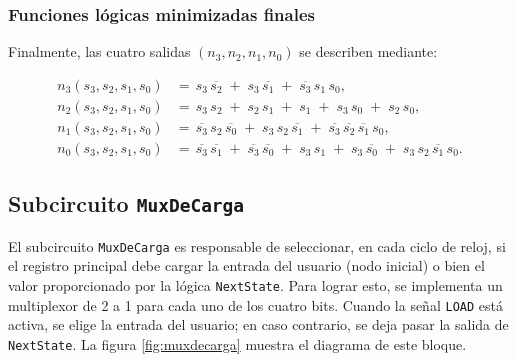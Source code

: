 \documentclass[12pt]{article}
\begin{document}
\subsubsection{Funciones lógicas minimizadas finales}

Finalmente, las cuatro salidas \((n_{3},n_{2},n_{1},n_{0})\) se describen mediante:

\[
\begin{aligned}
  n_{3}(s_{3},s_{2},s_{1},s_{0})
  &=\, s_{3}\,\overline{s_{2}}
    \;+\; s_{3}\,\overline{s_{1}}
    \;+\; \overline{s_{3}}\,s_{1}\,s_{0},\\[6pt]
  n_{2}(s_{3},s_{2},s_{1},s_{0})
  &=\, s_{3}\,s_{2}
    \;+\; s_{2}\,s_{1}
    \;+\; s_{1}
    \;+\; s_{3}\,s_{0}
    \;+\; s_{2}\,s_{0},\\[6pt]
  n_{1}(s_{3},s_{2},s_{1},s_{0})
  &=\, \overline{s_{3}}\,s_{2}\,\overline{s_{0}}
    \;+\; s_{3}\,s_{2}\,\overline{s_{1}}
    \;+\; \overline{s_{3}}\,\overline{s_{2}}\,\overline{s_{1}}\,s_{0},\\[6pt]
  n_{0}(s_{3},s_{2},s_{1},s_{0})
  &=\, \overline{s_{3}}\,\overline{s_{1}}
    \;+\; \overline{s_{3}}\,\overline{s_{0}}
    \;+\; s_{3}\,s_{1}
    \;+\; s_{3}\,\overline{s_{0}}
    \;+\; s_{3}\,s_{2}\,\overline{s_{1}}\,s_{0}.
\end{aligned}
\]

\newpage

\subsection{Subcircuito \texttt{MuxDeCarga}}

El subcircuito \texttt{MuxDeCarga} es responsable de seleccionar, en cada ciclo de reloj, 
si el registro principal debe cargar la entrada del usuario (nodo inicial) o bien el valor 
proporcionado por la lógica \texttt{NextState}. Para lograr esto, se implementa un multiplexor 
de 2 a 1 para cada uno de los cuatro bits. Cuando la señal \texttt{LOAD} está activa, se elige 
la entrada del usuario; en caso contrario, se deja pasar la salida de \texttt{NextState}. 
La figura \ref{fig:muxdecarga} muestra el diagrama de este bloque.
\end{document}
